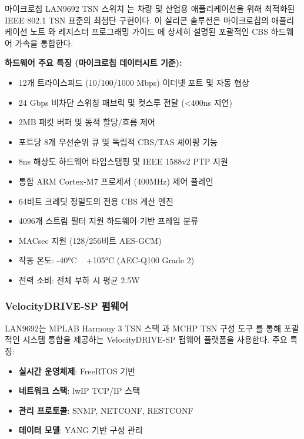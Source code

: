 \documentclass[twocolumn,10pt]{article}
\begin{document}
마이크로칩 LAN9692 TSN 스위치 \cite{microchip2024lan9692}는 차량 및 산업용 애플리케이션을 위해 최적화된 IEEE 802.1 TSN 표준의 최첨단 구현이다. 이 실리콘 솔루션은 마이크로칩의 애플리케이션 노트 \cite{microchip2024cbs_app}와 레지스터 프로그래밍 가이드 \cite{microchip2023register}에 상세히 설명된 포괄적인 CBS 하드웨어 가속을 통합한다.

\textbf{하드웨어 주요 특징 (마이크로칩 데이터시트 \cite{microchip2024lan9692} 기준):}
\begin{itemize}
    \item 12개 트라이스피드 (10/100/1000 Mbps) 이더넷 포트 및 자동 협상
    \item 24 Gbps 비차단 스위칭 패브릭 및 컷스루 전달 (<400ns 지연)
    \item 2MB 패킷 버퍼 및 동적 할당/흐름 제어
    \item 포트당 8개 우선순위 큐 및 독립적 CBS/TAS 셰이핑 기능
    \item 8ns 해상도 하드웨어 타임스탬핑 및 IEEE 1588v2 PTP 지원
    \item 통합 ARM Cortex-M7 프로세서 (400MHz) 제어 플레인
    \item 64비트 크레딧 정밀도의 전용 CBS 계산 엔진
    \item 4096개 스트림 필터 지원 하드웨어 기반 프레임 분류
    \item MACsec 지원 (128/256비트 AES-GCM) \cite{microchip2024security}
    \item 작동 온도: -40°C ~ +105°C (AEC-Q100 Grade 2)
    \item 전력 소비: 전체 부하 시 평균 2.5W \cite{microchip2024power}
\end{itemize}

\subsubsection{VelocityDRIVE-SP 펌웨어}

LAN9692는 MPLAB Harmony 3 TSN 스택 \cite{microchip2024harmony}과 MCHP TSN 구성 도구 \cite{microchip2023configurator}를 통해 포괄적인 시스템 통합을 제공하는 VelocityDRIVE-SP 펌웨어 플랫폼을 사용한다. 주요 특징:

\begin{itemize}
    \item \textbf{실시간 운영체제}: FreeRTOS 기반
    \item \textbf{네트워크 스택}: lwIP TCP/IP 스택
    \item \textbf{관리 프로토콜}: SNMP, NETCONF, RESTCONF
    \item \textbf{데이터 모델}: YANG 기반 구성 관리
\end{itemize}
\end{document}
